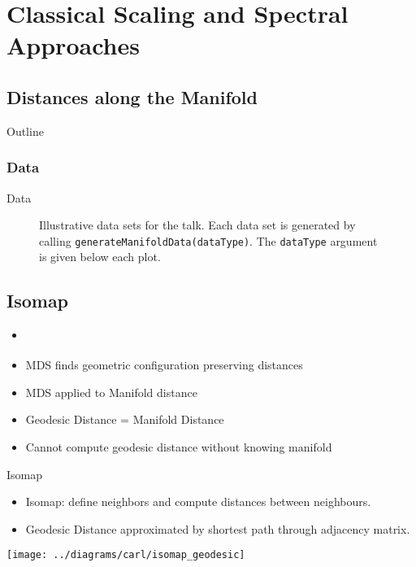 \chapter{Classical Scaling and Spectral Approaches}
\label{chap:spectral}




\section{Distances along the Manifold}

Outline  


\subsection{Data}

Data

%
\begin{figure}
 

\caption{Illustrative data sets for the talk. Each data set is generated by
calling \texttt{generateManifoldData(dataType)}. The \texttt{dataType}
argument is given below each plot.}

\end{figure}



\section{Isomap}


\begin{itemize}
\item \emph{\cite{Tenenbaum:isomap00}}
\item MDS finds geometric configuration preserving distances 
\item MDS applied to Manifold distance 
\item Geodesic Distance = Manifold Distance 
\item Cannot compute geodesic distance without knowing manifold 
\end{itemize}
Isomap
\begin{itemize}
\item Isomap: define neighbors and compute distances between neighbours.
\item Geodesic Distance approximated by shortest path through adjacency
matrix. 
\end{itemize}
\texttt{[image: ../diagrams/carl/isomap\_geodesic]}


